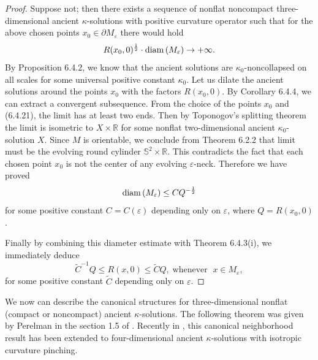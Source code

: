 \begin{proof}
Suppose not; then there exists a sequence of nonflat noncompact
three-dimensional ancient $\kappa$-solutions with positive
curvature operator such that for the above chosen points $x_0\in
\partial M_{\varepsilon}$ there would hold
\begin{equation} R(x_0,0)^{\frac{1}{2}}\cdot
{\rm diam}\,(M_{\varepsilon})\rightarrow +\infty. %
\end{equation} By Proposition 6.4.2, we know that the ancient solutions are
$\kappa_0$-noncollapsed on all scales for some universal positive
constant $\kappa_0$. Let us dilate the ancient solutions around
the points $x_0$ with the factors $R(x_0,0)$. By Corollary 6.4.4,
we can extract a convergent subsequence. From the choice of the
points $x_0$ and (6.4.21), the limit has at least two ends. Then
by Toponogov's splitting theorem the limit is isometric to
$X\times\mathbb{R} $ for some nonflat two-dimensional ancient
$\kappa_0$-solution $X$. Since $M$ is orientable, we conclude from
Theorem 6.2.2 that limit must be the evolving round cylinder
$\mathbb{S}^2\times\mathbb{R}$. This contradicts the fact that
each chosen point $x_0$ is not the center of any evolving
$\varepsilon$-neck. Therefore we have proved
$$
{\rm diam}\,(M_{\varepsilon})\leq CQ^{-\frac{1}{2}}
$$
for some positive constant $C=C(\varepsilon)$ depending only on
$\varepsilon$, where $Q=R(x_0,0)$.

Finally by combining this diameter estimate with Theorem 6.4.3(i),
we immediately deduce
$$
\widetilde{C}^{-1}Q\leq R(x,0)\leq \widetilde{C}Q,\;\mbox{
whenever }\;x\in M_{\varepsilon},
$$
for some positive constant $\widetilde{C}$ depending only on
$\varepsilon$.
\end{proof}

We now can describe the canonical structures for three-dimensional
nonflat (compact or noncompact) ancient $\kappa$-solutions. The
following theorem was given by Perelman in the section 1.5 of
\cite{P2}. Recently in \cite{CZ05F}, this canonical neighborhood
result has been extended to four-dimensional ancient
$\kappa$-solutions with isotropic curvature pinching.

